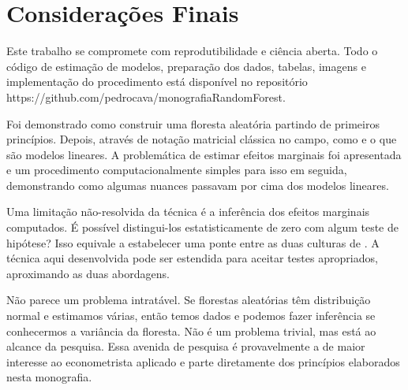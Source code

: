 \chapter{Considerações Finais}
\label{cap:conclusoes}

Este trabalho se compromete com reprodutibilidade e ciência aberta. Todo o código de estimação de modelos, preparação dos dados, tabelas, imagens e implementação do procedimento está disponível no repositório https://github.com/pedrocava/monografiaRandomForest. 


Foi demonstrado como construir uma floresta aleatória partindo de primeiros princípios. Depois, através de notação matricial clássica no campo, como e o que são modelos lineares. A problemática de estimar efeitos marginais foi apresentada e um procedimento computacionalmente simples para isso em seguida, demonstrando como algumas nuances passavam por cima dos modelos lineares.


Uma limitação não-resolvida da técnica é a inferência dos efeitos marginais computados. É possível distingui-los estatisticamente de zero com algum teste de hipótese? Isso equivale a estabelecer uma ponte entre as duas culturas de . A técnica aqui desenvolvida pode ser estendida para aceitar testes apropriados, aproximando as duas abordagens.


Não parece um problema intratável. Se florestas aleatórias têm distribuição normal e estimamos várias, então temos dados e podemos fazer inferência se conhecermos a variância da floresta. Não é um problema trivial, mas está ao alcance da pesquisa. Essa avenida de pesquisa é provavelmente a de maior interesse ao econometrista aplicado e parte diretamente dos princípios elaborados nesta monografia.





